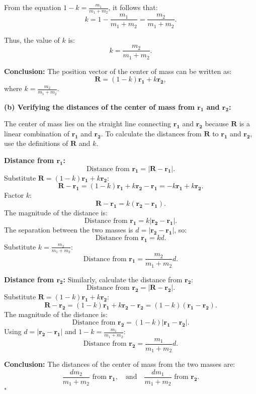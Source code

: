From the equation $1 - k = \frac{m_1}{m_1 + m_2}$, it follows that:
\[
k = 1 - \frac{m_1}{m_1 + m_2} = \frac{m_2}{m_1 + m_2}.
\]

Thus, the value of $k$ is:
\[
k = \frac{m_2}{m_1 + m_2}.
\]

\textbf{Conclusion:} The position vector of the center of mass can be written as:
\[
\mathbf{R} = (1 - k)\mathbf{r_1} + k\mathbf{r_2},
\]
where $k = \frac{m_2}{m_1 + m_2}$.

\textbf{(b) Verifying the distances of the center of mass from $\mathbf{r_1}$ and $\mathbf{r_2}$:}

The center of mass lies on the straight line connecting $\mathbf{r_1}$ and $\mathbf{r_2}$ because $\mathbf{R}$ is a linear combination of $\mathbf{r_1}$ and $\mathbf{r_2}$. To calculate the distances from $\mathbf{R}$ to $\mathbf{r_1}$ and $\mathbf{r_2}$, use the definitions of $\mathbf{R}$ and $k$.

\textbf{Distance from $\mathbf{r_1}$:}
\[
\text{Distance from } \mathbf{r_1} = |\mathbf{R} - \mathbf{r_1}|.
\]
Substitute $\mathbf{R} = (1 - k)\mathbf{r_1} + k\mathbf{r_2}$:
\[
\mathbf{R} - \mathbf{r_1} = (1 - k)\mathbf{r_1} + k\mathbf{r_2} - \mathbf{r_1} = -k\mathbf{r_1} + k\mathbf{r_2}.
\]
Factor $k$:
\[
\mathbf{R} - \mathbf{r_1} = k(\mathbf{r_2} - \mathbf{r_1}).
\]
The magnitude of the distance is:
\[
\text{Distance from } \mathbf{r_1} = k|\mathbf{r_2} - \mathbf{r_1}|.
\]
The separation between the two masses is $d = |\mathbf{r_2} - \mathbf{r_1}|$, so:
\[
\text{Distance from } \mathbf{r_1} = k d.
\]
Substitute $k = \frac{m_2}{m_1 + m_2}$:
\[
\text{Distance from } \mathbf{r_1} = \frac{m_2}{m_1 + m_2} d.
\]

\textbf{Distance from $\mathbf{r_2}$:}
Similarly, calculate the distance from $\mathbf{r_2}$:
\[
\text{Distance from } \mathbf{r_2} = |\mathbf{R} - \mathbf{r_2}|.
\]
Substitute $\mathbf{R} = (1 - k)\mathbf{r_1} + k\mathbf{r_2}$:
\[
\mathbf{R} - \mathbf{r_2} = (1 - k)\mathbf{r_1} + k\mathbf{r_2} - \mathbf{r_2} = (1 - k)(\mathbf{r_1} - \mathbf{r_2}).
\]
The magnitude of the distance is:
\[
\text{Distance from } \mathbf{r_2} = (1 - k)|\mathbf{r_1} - \mathbf{r_2}|.
\]
Using $d = |\mathbf{r_2} - \mathbf{r_1}|$ and $1 - k = \frac{m_1}{m_1 + m_2}$:
\[
\text{Distance from } \mathbf{r_2} = \frac{m_1}{m_1 + m_2} d.
\]

\textbf{Conclusion:} The distances of the center of mass from the two masses are:
\[
\frac{dm_2}{m_1 + m_2} \text{ from } \mathbf{r_1}, \quad \text{and} \quad \frac{dm_1}{m_1 + m_2} \text{ from } \mathbf{r_2}.
\]"

